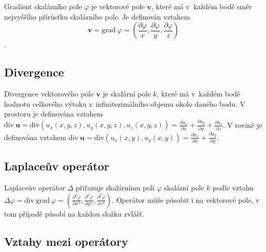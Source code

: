 \documentclass{book}
\newcommand{\vect}[1]{\boldsymbol{#1}}
\newcommand{\grad}{\mathrm{grad}}
\newcommand{\diverg}{\mathrm{div}}
\begin{document}
Gradient skalárního pole \(\varphi\) je vektorové pole \(\vect{v}\), které má v~každém bodě směr nejvyššího přírůstku skalárního pole. Je definován vztahem
\[
\vect{v} = \grad \ \varphi = \left(\frac{\partial \varphi}{x}, \frac{\partial \varphi}{y}, \frac{\partial \varphi}{z}\right)
\].

\subsection{Divergence}

Divergence vektorového pole \(\vect{v}\) je skalární pole \(k\), které má v~každém bodě hodnotu celkového výtoku z~infinitezimálního objemu okolo daného bodu. V prostoru je definována vztahem \(\diverg \ \vect{u} = \diverg (u_x(x, y, z), u_y(x, y, z), u_z(x, y, z)) = \frac{\partial u_x}{\partial x} + \frac{\partial u_y}{\partial y} + \frac{\partial u_z}{\partial z}\).
V rovině je definována vztahem \(\diverg \ \vect{u} = \diverg (u_x(x, y), u_y(x, y)) = \frac{\partial u_x}{\partial x} + \frac{\partial u_y}{\partial y}\).
 

\subsection{Laplaceův operátor}

Laplaceův operátor \(\Delta\) přiřazuje skalárnímu poli \(\varphi\) skalární pole \(k\) podle vztahu \(\Delta \varphi = \diverg \ \grad \ \varphi = \left(\frac{\partial^2 \varphi}{\partial x^2}, \frac{\partial^2 \varphi}{\partial y^2}, \frac{\partial^2 \varphi}{\partial z^2}\right)\). Operátor může působit i na vektorové pole, v tom případě působí na každou složku zvlášť.

\subsection{Vztahy mezi operátory}
\end{document}
